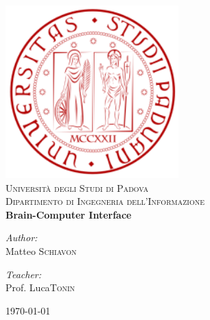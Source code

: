 \begin{titlepage}
\begin{center}

\includegraphics[width=0.5\textwidth]{images/unipd.png}\\[2.0cm]

\textsc{\LARGE Universit\`a degli Studi di Padova}\\[0.5cm]
\textsc{\Large Dipartimento di Ingegneria dell'Informazione}\\[2.5cm]

\textbf{\Huge Brain-Computer Interface}\\[4.0cm]

\begin{minipage}{0.4\textwidth}
\begin{flushleft} \large
\emph{Author:} \\
Matteo \textsc{Schiavon}
\end{flushleft}
\end{minipage}
\begin{minipage}{0.4\textwidth}
\begin{flushright} \large
\emph{Teacher:} \\
Prof. Luca\textsc{Tonin}
\end{flushright}
\end{minipage}

\vfill

{\large \today}

\end{center}
\end{titlepage}
